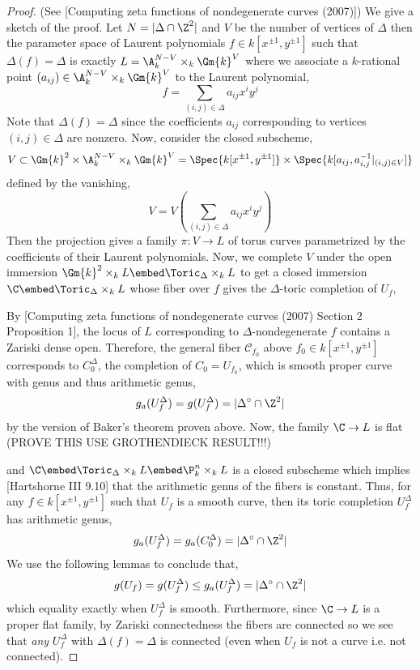 \documentclass[12pt]{article}
\begin{document}
\begin{proof}
(See [Computing zeta functions of nondegenerate curves (2007)]) We give a sketch of the proof. Let $N = | \Delta \cap \Z^2 |$ and $V$ be the number of vertices of $\Delta$ then the parameter space of Laurent polynomials $f \in k[x^{\pm 1}, y^{\pm 1}]$ such that $\Delta(f) = \Delta$ is exactly $L = \A_k^{N-V} \times_k \Gm{k}^V$ where we associate a $k$-rational point $(a_{ij}) \in \A_k^{N-V} \times_k \Gm{k}^V$ to the Laurent polynomial,
\[ f = \sum_{(i,j) \in \Delta} a_{ij} x^i y^j \]
Note that $\Delta(f) = \Delta$ since the coefficients $a_{ij}$ corresponding to vertices $(i,j) \in \Delta$ are nonzero.
Now, consider the closed subscheme,
\[ V \subset \Gm{k}^2 \times \A_k^{N - V} \times_k \Gm{k}^V = \Spec{k[x^{\pm 1}, y^{\pm 1}]} \times \Spec{k[a_{ij}, a_{i,j}^{-1} |_{(i,j) \in V}]} \]
defined by the vanishing,
\[ V = V\left( \sum_{(i,j) \in \Delta} a_{ij} x^i y^j \right) \]
Then the projection gives a family $\pi : V \to L$ of torus curves parametrized by the coefficients of their Laurent polynomials. Now, we complete $V$ under the open immersion $\Gm{k}^2 \times_k L \embed \Toric_\Delta \times_k L$ to get a closed immersion $\C \embed \Toric_\Delta \times_k L$ whose fiber over $f$ gives the $\Delta$-toric completion of $U_f$, 
\begin{center}
\end{center}
By [Computing zeta functions of nondegenerate curves (2007) Section 2 Proposition 1], the locus of $L$ corresponding to $\Delta$-nondegenerate $f$ contains a Zariski dense open. Therefore, the general fiber $\mathcal{C}_{f_0}$ above $f_0 \in k[x^{\pm 1}, y^{\pm 1}]$ corresponds to $C_0^\Delta$, the completion of $C_0 = U_{f_0}$, which is smooth proper curve with genus and thus arithmetic genus,
\[ g_a(U_f^\Delta) = g(U_f^\Delta) = | \Delta^\circ \cap \Z^2 | \]
by the version of Baker's theorem proven above. Now, the family $\C \to L$ is flat (PROVE THIS USE GROTHENDIECK RESULT!!!) 



and $\C \embed \Toric_\Delta \times_k L\embed \P^n_k \times_k L$ is a closed subscheme which implies [Hartshorne III 9.10] that the arithmetic genus of the fibers is constant. Thus, for any $f \in k[x^{\pm 1}, y^{\pm 1}]$ such that $U_f$ is a smooth curve, then its toric completion $U_f^\Delta$ has arithmetic genus,
\[ g_a(U_f^\Delta) = g_a(C_0^\Delta) = | \Delta^\circ \cap \Z^2 | \]
We use the following lemmas to conclude that,
\[ g(U_f) = g(U_f^\Delta) \le g_a(U_f^\Delta) = | \Delta^\circ \cap \Z^2 | \]
which equality exactly when $U_f^\Delta$ is smooth. Furthermore, since $\C \to L$ is a proper flat family, by Zariski connectedness the fibers are connected so we see that \textit{any} $U_f^\Delta$ with $\Delta(f) = \Delta$ is connected (even when $U_f$ is not a curve i.e. not connected).
\end{proof}
\end{document}
